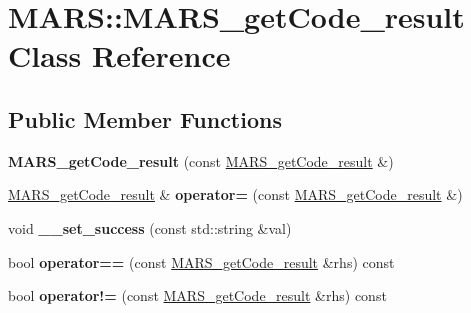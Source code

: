 \hypertarget{classMARS_1_1MARS__getCode__result}{}\section{M\+A\+RS\+:\+:M\+A\+R\+S\+\_\+get\+Code\+\_\+result Class Reference}
\label{classMARS_1_1MARS__getCode__result}
\subsection*{Public Member Functions}
\begin{DoxyCompactItemize}
\item 
\mbox{\label{classMARS_1_1MARS__getCode__result_a20d2bdf4d545dfe57c1b083650bfedb4}} 
{\bfseries M\+A\+R\+S\+\_\+get\+Code\+\_\+result} (const \hyperlink{classMARS_1_1MARS__getCode__result}{M\+A\+R\+S\+\_\+get\+Code\+\_\+result} \&)
\item 
\mbox{\label{classMARS_1_1MARS__getCode__result_a0dda8f4061fc5f85e20324d707ead5b3}} 
\hyperlink{classMARS_1_1MARS__getCode__result}{M\+A\+R\+S\+\_\+get\+Code\+\_\+result} \& {\bfseries operator=} (const \hyperlink{classMARS_1_1MARS__getCode__result}{M\+A\+R\+S\+\_\+get\+Code\+\_\+result} \&)
\item 
\mbox{\label{classMARS_1_1MARS__getCode__result_a55feb1697ab48cc57a11eb766104e8fb}} 
void {\bfseries \+\_\+\+\_\+set\+\_\+success} (const std\+::string \&val)
\item 
\mbox{\label{classMARS_1_1MARS__getCode__result_a52cef84f125e7a7f9396cd1805da3803}} 
bool {\bfseries operator==} (const \hyperlink{classMARS_1_1MARS__getCode__result}{M\+A\+R\+S\+\_\+get\+Code\+\_\+result} \&rhs) const
\item 
\mbox{\label{classMARS_1_1MARS__getCode__result_ad3790389d7d8f9e14598206efe69aa26}} 
bool {\bfseries operator!=} (const \hyperlink{classMARS_1_1MARS__getCode__result}{M\+A\+R\+S\+\_\+get\+Code\+\_\+result} \&rhs) const
\item 
\mbox{\label{classMARS_1_1MARS__getCode__result_aeaa576da7821a43065eca7324565532b}} 

\end{DoxyCompactItemize}
